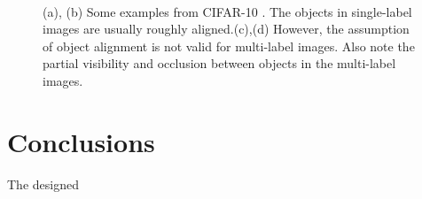 \documentclass[conference]{IEEEtran}
\begin{document}
\begin{figure} 
    \centering
    \hfill
    \\
    \hfill
  \caption{(a), (b) Some examples from CIFAR-10 \cite{4}. The objects in     
        single-label images are usually roughly aligned.(c),(d) However, the 
        assumption of object alignment is not valid for multi-label
        images. Also note the partial visibility and occlusion
        between objects in the multi-label images.}
  \label{fig1} 
\end{figure}




\section{Conclusions}
The designed 




\end{document}

